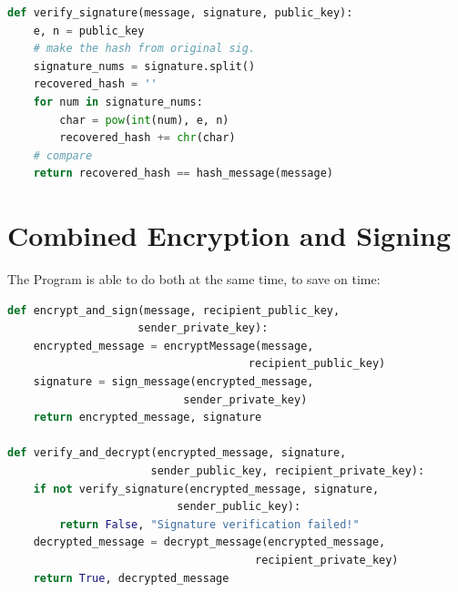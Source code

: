 \documentclass[12pt,a4paper]{report}
\begin{document}
\begin{lstlisting}[language=Python, caption=Signature Verification]
def verify_signature(message, signature, public_key):
    e, n = public_key
    # make the hash from original sig.
    signature_nums = signature.split()
    recovered_hash = ''
    for num in signature_nums:
        char = pow(int(num), e, n)
        recovered_hash += chr(char)
    # compare
    return recovered_hash == hash_message(message)
\end{lstlisting}

\section{Combined Encryption and Signing}
The Program is able to do both at the same time, to save on time:

\begin{lstlisting}[language=Python, caption=Encryption with Signature]
def encrypt_and_sign(message, recipient_public_key, 
                    sender_private_key):
    encrypted_message = encryptMessage(message, 
                                     recipient_public_key)
    signature = sign_message(encrypted_message, 
                           sender_private_key)
    return encrypted_message, signature

def verify_and_decrypt(encrypted_message, signature, 
                      sender_public_key, recipient_private_key):
    if not verify_signature(encrypted_message, signature, 
                          sender_public_key):
        return False, "Signature verification failed!"
    decrypted_message = decrypt_message(encrypted_message, 
                                      recipient_private_key)
    return True, decrypted_message
\end{lstlisting}
\end{document}
